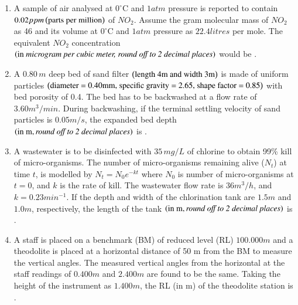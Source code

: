 \documentclass[journal,12pt,onecolumn]{IEEEtran}
\theoremstyle{remark}
\begin{document}
\begin{enumerate}
\item A sample of air analysed at $0^\circ$C and $1atm$ pressure is reported to contain $0.02 ppm \left(\text{parts per million}\right)$ of $NO_2$. Assume the gram molecular mass of $NO_2$ as 46 and its volume at $0^\circ$C and $1atm$ pressure as $22.4 litres$ per mole. The equivalent $NO_2$ concentration $\left(\text{in }\textit{microgram per cubic meter, round off to 2 decimal places}\right)$ would be \underline{\hspace{2cm}}.

\hfill{}

\item A $0.80 \, m$ deep bed of sand filter $\left(\text{length 4m and width 3m}\right)$ is made of uniform particles $\left(\text{diameter = 0.40mm, specific gravity = 2.65, shape factor = 0.85}\right)$ with bed porosity of 0.4. The bed has to be backwashed at a flow rate of $3.60m^3/min$. During backwashing, if the terminal settling velocity of sand particles is $0.05 m/s$, the expanded bed depth $\left(\text{in m}, \textit{round off to 2 decimal places}\right)$ is \underline{\hspace{2cm}}.

\hfill{}

\item A wastewater is to be disinfected with $35 \, mg/L$ of chlorine to obtain 99\% kill of micro-organisms. The number of micro-organisms remaining alive ($N_t$) at time $t$, is modelled by $N_t = N_0 e^{-kt}$
where $N_0$ is number of micro-organisms at $t = 0$, and $k$ is the rate of kill. The wastewater flow rate is $36 m^3/h$, and $k = 0.23 min^{-1}$. If the depth and width of the chlorination tank are $1.5 m$ and $1.0 m$, respectively, the length of the tank $\left(\text{in m}, \textit{round off to 2 decimal places}\right)$ is \underline{\hspace{2cm}}.

\hfill{}

\item A staff is placed on a benchmark (BM) of reduced level (RL) $100.000 m$ and a theodolite is placed at a horizontal distance of 50 m from the BM to measure the vertical angles. The measured vertical angles from the horizontal at the staff readings of $0.400m$ and $2.400m$ are found to be the same. Taking the height of the instrument as $1.400 m$, the RL (in m) of the theodolite station is \underline{\hspace{2cm}}.

\hfill{}


\end{enumerate}
\end{document}
